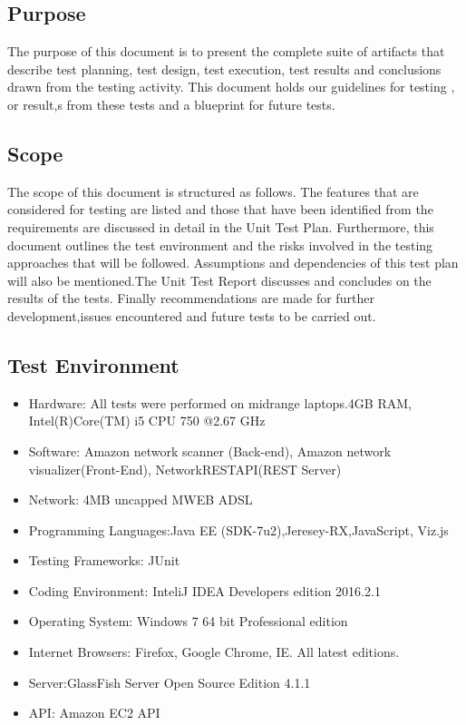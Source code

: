 \documentclass[hidelinks,a4paper,12pt]{article}
\begin{document}
\subsection{Purpose}
The purpose of this document is to present the complete suite of artifacts that describe test planning, test design, test execution, test results and conclusions drawn from the testing activity. This document holds our guidelines for testing , or result,s from these tests and a blueprint for future tests.


\subsection{Scope}
The scope of this document is structured as follows. The features that are considered for
testing are listed and those that have been identified from the requirements are
discussed in detail in the Unit Test Plan. Furthermore, this document outlines the test environment
and the risks involved in the testing approaches that will be followed. Assumptions and
dependencies of this test plan will also be mentioned.The Unit Test Report
discusses and concludes on the results of the tests. Finally recommendations are made for further development,issues encountered and future tests to be carried out.

\subsection{ Test Environment}



\begin{itemize}
  \item Hardware: All tests were performed on midrange laptops.4GB RAM, Intel(R)Core(TM) i5 CPU 750 @2.67 GHz
\item Software: Amazon network scanner (Back-end), Amazon network visualizer(Front-End), NetworkRESTAPI(REST Server)
\item Network: 4MB uncapped MWEB ADSL
  \item Programming Languages:Java EE (SDK-7u2),Jeresey-RX,JavaScript, Viz.js
  \item Testing Frameworks: JUnit
\item Coding Environment: InteliJ IDEA Developers edition 2016.2.1
\item Operating System: Windows 7 64 bit Professional edition
\item Internet Browsers: Firefox, Google Chrome, IE. All latest editions. 
\item Server:GlassFish Server Open Source Edition 4.1.1 
\item API: Amazon EC2 API 
\end{itemize}
\end{document}
